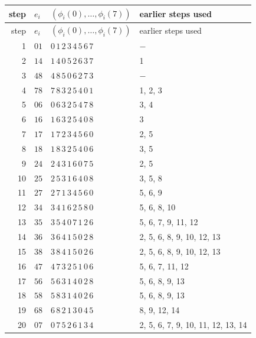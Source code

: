 \begin{longtable}{r l l l}
\toprule
step & $e_i$ & $(\phi_i(0),\ldots,\phi_i(7))$ & earlier steps used \\
\midrule
\endfirsthead
\toprule
step & $e_i$ & $(\phi_i(0),\ldots,\phi_i(7))$ & earlier steps used \\
\midrule
\endhead
1 & $01$ & $0\,1\,2\,3\,4\,5\,6\,7$ & $-$ \\
2 & $14$ & $1\,4\,0\,5\,2\,6\,3\,7$ & 1 \\
3 & $48$ & $4\,8\,5\,0\,6\,2\,7\,3$ & $-$ \\
4 & $78$ & $7\,8\,3\,2\,5\,4\,0\,1$ & 1, 2, 3 \\
5 & $06$ & $0\,6\,3\,2\,5\,4\,7\,8$ & 3, 4 \\
6 & $16$ & $1\,6\,3\,2\,5\,4\,0\,8$ & 3 \\
7 & $17$ & $1\,7\,2\,3\,4\,5\,6\,0$ & 2, 5 \\
8 & $18$ & $1\,8\,3\,2\,5\,4\,0\,6$ & 3, 5 \\
9 & $24$ & $2\,4\,3\,1\,6\,0\,7\,5$ & 2, 5 \\
10 & $25$ & $2\,5\,3\,1\,6\,4\,0\,8$ & 3, 5, 8 \\
11 & $27$ & $2\,7\,1\,3\,4\,5\,6\,0$ & 5, 6, 9 \\
12 & $34$ & $3\,4\,1\,6\,2\,5\,8\,0$ & 5, 6, 8, 10 \\
13 & $35$ & $3\,5\,4\,0\,7\,1\,2\,6$ & 5, 6, 7, 9, 11, 12 \\
14 & $36$ & $3\,6\,4\,1\,5\,0\,2\,8$ & 2, 5, 6, 8, 9, 10, 12, 13 \\
15 & $38$ & $3\,8\,4\,1\,5\,0\,2\,6$ & 2, 5, 6, 8, 9, 10, 12, 13 \\
16 & $47$ & $4\,7\,3\,2\,5\,1\,0\,6$ & 5, 6, 7, 11, 12 \\
17 & $56$ & $5\,6\,3\,1\,4\,0\,2\,8$ & 5, 6, 8, 9, 13 \\
18 & $58$ & $5\,8\,3\,1\,4\,0\,2\,6$ & 5, 6, 8, 9, 13 \\
19 & $68$ & $6\,8\,2\,1\,3\,0\,4\,5$ & 8, 9, 12, 14 \\
20 & $07$ & $0\,7\,5\,2\,6\,1\,3\,4$ & 2, 5, 6, 7, 9, 10, 11, 12, 13, 14 \\
\bottomrule
\end{longtable}